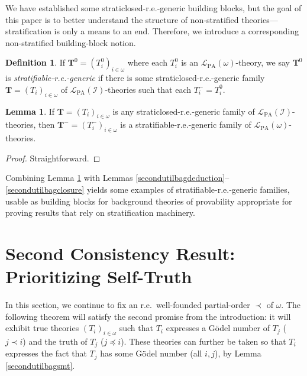 \documentclass[reqno]{article}
\theoremstyle{definition}
\newtheorem{lemma}[theorem]{Lemma}
\newtheorem{definition}[theorem]{Definition}
\def\L{\mathscr{L}}
\def\T{\mathbf{T}}
\def\LPA{\L_{\mathrm{PA}}}
\def\indset{\mathcal I}
\begin{document}
We have established some straticlosed-r.e.-generic building blocks, but
the goal of this paper is to better understand the structure of non-stratified
theories---stratification is only a means to an end.
Therefore, we introduce a corresponding non-stratified building-block notion.

\begin{definition}
If $\T^0=(T^0_i)_{i\in\omega}$ where each $T^0_i$ is an $\LPA(\omega)$-theory,
we say $\T^0$ is \emph{stratifiable-r.e.-generic} if there is
some straticlosed-r.e.-generic family $\T=(T_i)_{i\in\omega}$ of
$\LPA(\indset)$-theories such that
each $T^-_i=T^0_i$.
\end{definition}

\begin{lemma}
\label{trivialsourceofstratifiableregenericfamilies}
If $\T=(T_i)_{i\in\omega}$ is any straticlosed-r.e.-generic family of
$\LPA(\indset)$-theories,
then $\T^-=(T^-_i)_{i\in\omega}$ is a stratifiable-r.e.-generic family of
$\LPA(\omega)$-theories.
\end{lemma}

\begin{proof}
    Straightforward.
\end{proof}

Combining Lemma \ref{trivialsourceofstratifiableregenericfamilies} with
Lemmas \ref{secondutilbagdeduction}--\ref{secondutilbagclosure} yields
some examples of stratifiable-r.e.-generic families, usable as building
blocks for background theories of provability appropriate for proving
results that rely on stratification machinery.

\section[Second Consistency Result: Prioritizing Self-Truth]{Second Consistency Result:\\Prioritizing Self-Truth}

In this section, we continue to fix an r.e.\ well-founded partial-order $\prec$
of $\omega$.
The following theorem will satisfy the second promise from the introduction:
it will exhibit true theories $(T_i)_{i\in\omega}$ such that $T_i$ expresses 
a G\"odel number of $T_j$ ($j\prec i$) and the truth of $T_j$ ($j\preceq 
i$).  These theories can further be taken so that $T_i$ expresses the fact 
that $T_j$ has some G\"odel number (all $i,j$), by Lemma \ref{secondutilbagsmt}.
\end{document}
